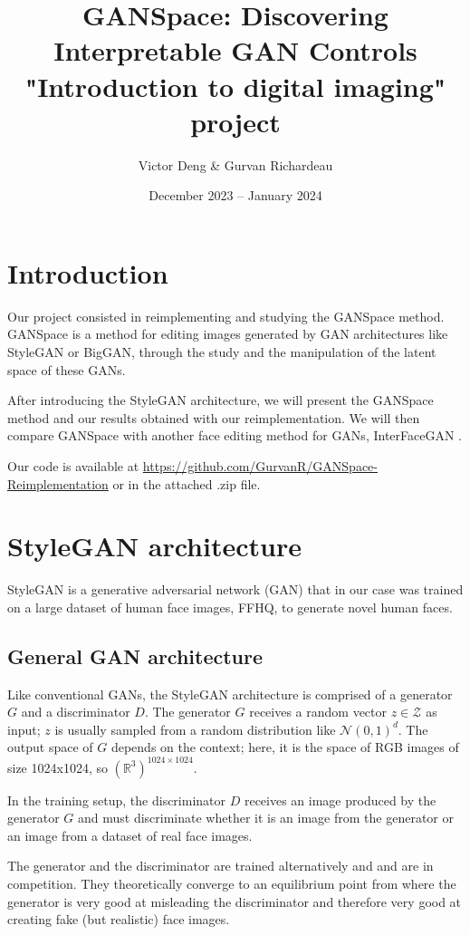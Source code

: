 \documentclass[a4paper]{article}
\title{GANSpace: Discovering Interpretable GAN Controls \cite{harkonen2020ganspace} \\ \Large "Introduction to digital imaging" project}
\author{Victor Deng \& Gurvan Richardeau}
\date{December 2023 -- January 2024}
\begin{document}
\maketitle
\section{Introduction}

Our project consisted in reimplementing and studying the GANSpace method. GANSpace is a method for editing images generated by GAN architectures like StyleGAN or BigGAN, through the study and the manipulation of the latent space of these GANs.

After introducing the StyleGAN architecture, we will present the GANSpace method and our results obtained with our reimplementation. We will then compare GANSpace with another face editing method for GANs, InterFaceGAN \cite{shen2020interfacegan}. %

Our code is available at \url{https://github.com/GurvanR/GANSpace-Reimplementation} or in the attached .zip file.

\section{StyleGAN architecture}

StyleGAN \cite{karras2019stylebased} is a generative adversarial network (GAN) that in our case was trained on a large dataset of human face images, FFHQ, to generate novel human faces. 

\subsection{General GAN architecture}
Like conventional GANs, the StyleGAN architecture is comprised of a generator $G$ and a discriminator $D$. The generator $G$ receives a random vector $z \in \mathcal{Z} $ as input; $z$ is usually sampled from a random distribution like $ \mathcal{N}(0, 1)^d $. The output space of $G$ depends on the context; here, it is the space of RGB images of size 1024x1024, so $(\mathbb{R}^3)^{1024 \times 1024}$.


In the training setup, the discriminator $D$ receives an image produced by the generator $G$ and must discriminate whether it is an image from the generator or an image from a dataset of real face images. 

The generator and the discriminator are trained alternatively and and are in competition. They theoretically converge to an equilibrium point from where the generator is very good at misleading the discriminator and therefore very good at creating fake (but realistic) face images.
\end{document}
